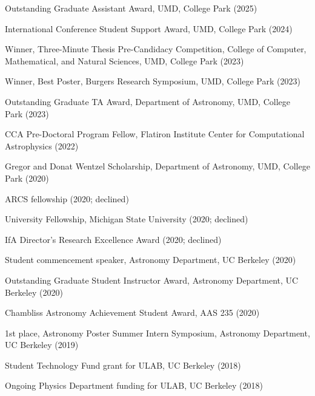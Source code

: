 \item[{\color{numcolor}\scriptsize16}] Outstanding Graduate Assistant Award, UMD, College Park (2025)

\item[{\color{numcolor}\scriptsize15}] International Conference Student Support Award, UMD, College Park (2024)

\item[{\color{numcolor}\scriptsize14}] Winner, Three-Minute Thesis Pre-Candidacy Competition, College of Computer, Mathematical, and Natural Sciences, UMD, College Park (2023)

\item[{\color{numcolor}\scriptsize13}] Winner, Best Poster, Burgers Research Symposium, UMD, College Park (2023)

\item[{\color{numcolor}\scriptsize12}] Outstanding Graduate TA Award, Department of Astronomy, UMD, College Park (2023)

\item[{\color{numcolor}\scriptsize11}] CCA Pre-Doctoral Program Fellow, Flatiron Institute Center for Computational Astrophysics (2022)

\item[{\color{numcolor}\scriptsize10}] Gregor and Donat Wentzel Scholarship, Department of Astronomy, UMD, College Park (2020)

\item[{\color{numcolor}\scriptsize9}] ARCS fellowship (2020; declined)

\item[{\color{numcolor}\scriptsize8}] University Fellowship, Michigan State University (2020; declined)

\item[{\color{numcolor}\scriptsize7}] IfA Director's Research Excellence Award (2020; declined)

\item[{\color{numcolor}\scriptsize6}] Student commencement speaker, Astronomy Department, UC Berkeley (2020)

\item[{\color{numcolor}\scriptsize5}] Outstanding Graduate Student Instructor Award, Astronomy Department, UC Berkeley (2020)

\item[{\color{numcolor}\scriptsize4}] Chambliss Astronomy Achievement Student Award, AAS 235 (2020)

\item[{\color{numcolor}\scriptsize3}] 1st place, Astronomy Poster Summer Intern Symposium, Astronomy Department, UC Berkeley (2019)

\item[{\color{numcolor}\scriptsize2}] Student Technology Fund grant for ULAB, UC Berkeley (2018)

\item[{\color{numcolor}\scriptsize1}] Ongoing Physics Department funding for ULAB, UC Berkeley (2018)